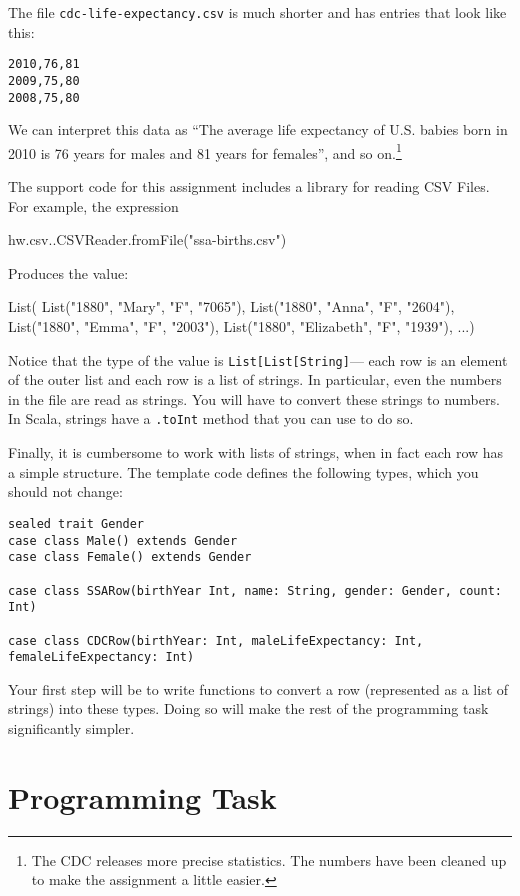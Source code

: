 \documentclass[9pt]{extbook}
\begin{document}
The file \texttt{cdc-life-expectancy.csv} is much shorter and has entries
that look like this:

\begin{verbatim}
2010,76,81
2009,75,80
2008,75,80
\end{verbatim}

We can interpret this data as ``The average life expectancy of U.S. babies born
in 2010 is 76 years for males and 81 years for females'', and so
on.\footnote{The CDC releases more precise statistics. The numbers have been
cleaned up to make the assignment a little easier.}

The support code for this assignment includes a library for reading
CSV Files. For example, the expression
\begin{scalacode}
hw.csv..CSVReader.fromFile("ssa-births.csv")
\end{scalacode}
Produces the value:
\begin{scalacode}
List(
  List("1880", "Mary", "F", "7065"),
  List("1880", "Anna", "F", "2604"),
  List("1880", "Emma", "F", "2003"),
  List("1880", "Elizabeth", "F", "1939"),
  ...)
\end{scalacode}
Notice that the type of the value is \lstinline|List[List[String]|---
each row is an element of the outer list and each row is a list of strings.
In particular, even the numbers in the file are read as strings. You will
have to convert these strings to numbers. In Scala, strings have a 
\lstinline|.toInt| method that you can use to do so.

Finally, it is cumbersome to work with lists of strings,
when in fact each row has a simple structure. The template code defines
the following types, which you should not change:

\begin{lstlisting}
sealed trait Gender
case class Male() extends Gender
case class Female() extends Gender

case class SSARow(birthYear Int, name: String, gender: Gender, count: Int)

case class CDCRow(birthYear: Int, maleLifeExpectancy: Int, femaleLifeExpectancy: Int)
\end{lstlisting}

Your first step will be to write functions to convert a
row (represented as a list of strings) into these types.
Doing so will make the rest of the programming task significantly simpler.


\section{Programming Task}
\end{document}
